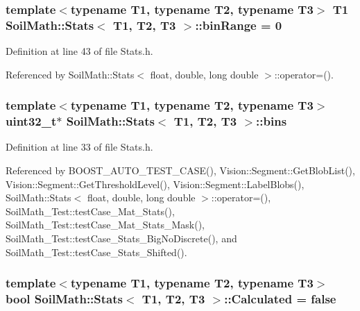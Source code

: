 \subsubsection[{bin\+Range}]{\setlength{\rightskip}{0pt plus 5cm}template$<$typename T1, typename T2, typename T3$>$ T1 {\bf Soil\+Math\+::\+Stats}$<$ T1, T2, T3 $>$\+::bin\+Range = 0}\label{class_soil_math_1_1_stats_a00be1d2a705a8aba532fbe726001bbb2}


Definition at line 43 of file Stats.\+h.



Referenced by Soil\+Math\+::\+Stats$<$ float, double, long double $>$\+::operator=().

\hypertarget{class_soil_math_1_1_stats_a00778b298b1ebb335eb0c4eed69e471c}{}
\subsubsection[{bins}]{\setlength{\rightskip}{0pt plus 5cm}template$<$typename T1, typename T2, typename T3$>$ uint32\+\_\+t$\ast$ {\bf Soil\+Math\+::\+Stats}$<$ T1, T2, T3 $>$\+::bins}\label{class_soil_math_1_1_stats_a00778b298b1ebb335eb0c4eed69e471c}


Definition at line 33 of file Stats.\+h.



Referenced by B\+O\+O\+S\+T\+\_\+\+A\+U\+T\+O\+\_\+\+T\+E\+S\+T\+\_\+\+C\+A\+S\+E(), Vision\+::\+Segment\+::\+Get\+Blob\+List(), Vision\+::\+Segment\+::\+Get\+Threshold\+Level(), Vision\+::\+Segment\+::\+Label\+Blobs(), Soil\+Math\+::\+Stats$<$ float, double, long double $>$\+::operator=(), Soil\+Math\+\_\+\+Test\+::test\+Case\+\_\+\+Mat\+\_\+\+Stats(), Soil\+Math\+\_\+\+Test\+::test\+Case\+\_\+\+Mat\+\_\+\+Stats\+\_\+\+Mask(), Soil\+Math\+\_\+\+Test\+::test\+Case\+\_\+\+Stats\+\_\+\+Big\+No\+Discrete(), and Soil\+Math\+\_\+\+Test\+::test\+Case\+\_\+\+Stats\+\_\+\+Shifted().

\hypertarget{class_soil_math_1_1_stats_a3d3cd491b829b2e30f6752fee38fe261}{}
\subsubsection[{Calculated}]{\setlength{\rightskip}{0pt plus 5cm}template$<$typename T1, typename T2, typename T3$>$ bool {\bf Soil\+Math\+::\+Stats}$<$ T1, T2, T3 $>$\+::Calculated = false}\label{class_soil_math_1_1_stats_a3d3cd491b829b2e30f6752fee38fe261}


